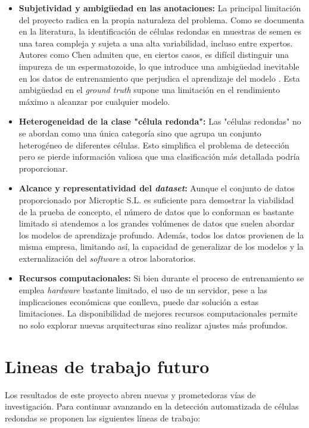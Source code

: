 \documentclass[12pt,a4paper,onecolumn,oneside]{report}
\begin{document}
\begin{itemize}
  \item \textbf{Subjetividad y ambigüedad en las anotaciones:} La principal limitación del proyecto radica en la propia naturaleza del problema. Como se documenta en la literatura, 
  la identificación de células redondas en muestras de semen es una tarea compleja y sujeta a una alta variabilidad, incluso entre expertos. Autores como Chen admiten que,
  en ciertos casos, es difícil distinguir una impureza de un espermatozoide, lo que introduce una ambigüedad inevitable en los datos de entrenamiento que perjudica el aprendizaje del modelo \cite{chen2024}.
  Esta ambigüedad en el \textit{ground truth} supone una limitación en el rendimiento máximo a alcanzar por cualquier modelo.
  \item \textbf{Heterogeneidad de la clase "célula redonda":} Las "células redondas" no se abordan como una única categoría sino que agrupa un conjunto heterogéneo de diferentes células. Esto simplifica el problema de detección pero se pierde información valiosa 
  que una clasificación más detallada podría proporcionar.
  \item \textbf{Alcance y representatividad del \textit{dataset}:} Aunque el conjunto de datos proporcionado por Microptic S.L. \cite{microptic} es suficiente para demostrar la viabilidad de la prueba de concepto, 
  el número de datos que lo conforman es bastante limitado si atendemos a los grandes volúmenes de datos que suelen abordar los modelos de aprendizaje profundo. Además, todos los datos provienen de la misma empresa, limitando así, la capacidad de generalizar de los modelos
  y la externalización del \textit{software} a otros laboratorios.
  \item \textbf{Recursos computacionales:} Si bien durante el proceso de entrenamiento se emplea \textit{hardware} bastante limitado, el uso de un servidor, pese a las implicaciones económicas que conlleva, puede dar solución a estas limitaciones.
  La disponibilidad de mejores recursos computacionales permite no solo explorar nuevas arquitecturas sino realizar ajustes más profundos.
\end{itemize}

\section{Lineas de trabajo futuro}
\label{sec:Lineas de trabajo futuro}

Los resultados de este proyecto abren nuevas y prometedoras vías de investigación. Para continuar avanzando en la detección automatizada de células redondas se proponen las siguientes líneas de trabajo:
\end{document}
